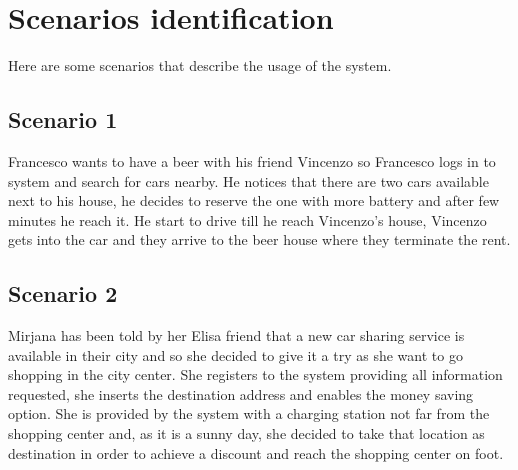 \section{Scenarios identification}
Here are some scenarios that describe the usage of the system.
\subsection{Scenario 1}
\label{scenario:1}
Francesco wants to have a beer with his friend Vincenzo so Francesco logs in to system and search for cars nearby. He notices that there are two cars available next to his house, he decides to reserve the one with more battery and after few minutes he reach it. He start to drive till he reach Vincenzo's house, Vincenzo gets into the car and they arrive to the beer house where they terminate the rent.

\subsection{Scenario 2}
\label{scenario:2}
Mirjana has been told by her Elisa friend that a new car sharing service is available in their city and so she decided to give it a try as she want to go shopping in the city center. She registers to the system providing all information requested, she inserts the destination address and enables the money saving option. She is provided by the system with a charging station not far from the shopping center and, as it is a sunny day, she decided to take that location as destination in order to achieve a discount and reach the shopping center on foot. 